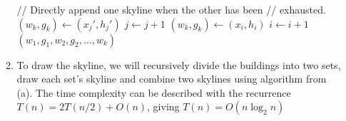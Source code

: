 \documentclass{article}
\begin{document}
\begin{enumerate}
\begin{enumerate}[label=\alph*)]
\begin{algorithmic}[1]
                \State // Directly append one skyline when the other has been
                \State // exhausted.
                        \State $(w_k, g_k) \gets (x_j', h_j')$
                        \State $j \gets j + 1$
                    \EndWhile
                        \State $(w_k, g_k) \gets (x_i, h_i)$
                        \State $i \gets i + 1$
                    \EndWhile
                \EndIf
            \State \Return $(w_1, g_1, w_2, g_2, \dots, w_k)$
        \end{algorithmic}

        \item To draw the skyline, we will recursively divide the buildings into two sets, draw each set's skyline and combine two skylines using algorithm from (a). The time complexity can be described with the recurrence $T(n) = 2T(n/2) + O(n)$, giving $T(n) = O(n\log_2 n)$
    \end{enumerate}
\end{enumerate}
\end{document}
